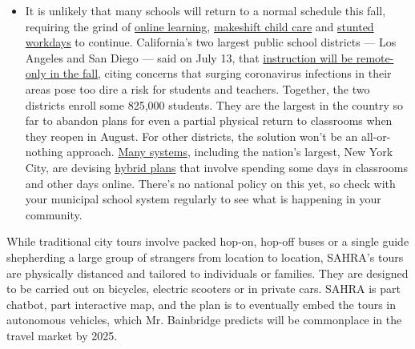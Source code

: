 \begin{itemize}
  \begin{itemize}
  \tightlist
  \item
    It is unlikely that many schools will return to a normal schedule
    this fall, requiring the grind of
    \href{https://www.nytimes3xbfgragh.onion/2020/06/05/us/coronavirus-education-lost-learning.html?action=click\&pgtype=Article\&state=default\&region=MAIN_CONTENT_3\&context=storylines_faq}{online
    learning},
    \href{https://www.nytimes3xbfgragh.onion/2020/05/29/us/coronavirus-child-care-centers.html?action=click\&pgtype=Article\&state=default\&region=MAIN_CONTENT_3\&context=storylines_faq}{makeshift
    child care} and
    \href{https://www.nytimes3xbfgragh.onion/2020/06/03/business/economy/coronavirus-working-women.html?action=click\&pgtype=Article\&state=default\&region=MAIN_CONTENT_3\&context=storylines_faq}{stunted
    workdays} to continue. California's two largest public school
    districts --- Los Angeles and San Diego --- said on July 13, that
    \href{https://www.nytimes3xbfgragh.onion/2020/07/13/us/lausd-san-diego-school-reopening.html?action=click\&pgtype=Article\&state=default\&region=MAIN_CONTENT_3\&context=storylines_faq}{instruction
    will be remote-only in the fall}, citing concerns that surging
    coronavirus infections in their areas pose too dire a risk for
    students and teachers. Together, the two districts enroll some
    825,000 students. They are the largest in the country so far to
    abandon plans for even a partial physical return to classrooms when
    they reopen in August. For other districts, the solution won't be an
    all-or-nothing approach.
    \href{https://bioethics.jhu.edu/research-and-outreach/projects/eschool-initiative/school-policy-tracker/}{Many
    systems}, including the nation's largest, New York City, are
    devising
    \href{https://www.nytimes3xbfgragh.onion/2020/06/26/us/coronavirus-schools-reopen-fall.html?action=click\&pgtype=Article\&state=default\&region=MAIN_CONTENT_3\&context=storylines_faq}{hybrid
    plans} that involve spending some days in classrooms and other days
    online. There's no national policy on this yet, so check with your
    municipal school system regularly to see what is happening in your
    community.
  \end{itemize}
\end{itemize}

While traditional city tours involve packed hop-on, hop-off buses or a
single guide shepherding a large group of strangers from location to
location, SAHRA's tours are physically distanced and tailored to
individuals or families. They are designed to be carried out on
bicycles, electric scooters or in private cars. SAHRA is part chatbot,
part interactive map, and the plan is to eventually embed the tours in
autonomous vehicles, which Mr. Bainbridge predicts will be commonplace
in the travel market by 2025.

